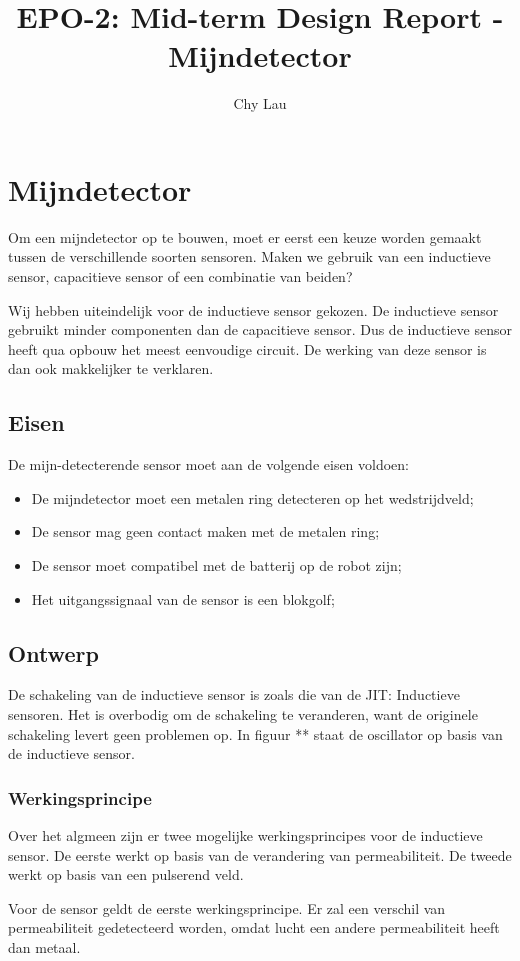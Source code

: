 \documentclass{report}
\title{EPO-2: Mid-term Design Report - Mijndetector}
\author{Chy Lau}
\begin{document}
\chapter{Mijndetector}
\label{ch:mijn}
Om een mijndetector op te bouwen, moet er eerst een keuze worden gemaakt tussen de verschillende soorten sensoren. Maken we gebruik van een inductieve sensor, capacitieve sensor of een combinatie van beiden?

Wij hebben uiteindelijk voor de inductieve sensor gekozen. De inductieve sensor gebruikt minder componenten dan de capacitieve sensor. Dus de inductieve sensor heeft qua opbouw het meest eenvoudige circuit. De werking van deze sensor is dan ook makkelijker te verklaren. 

\section{Eisen}
\label{sec:eisen}
De mijn-detecterende sensor moet aan de volgende eisen voldoen: 
\begin{itemize}
\item De mijndetector moet een metalen ring detecteren op het wedstrijdveld;
\item De sensor mag geen contact maken met de metalen ring;
\item De sensor moet compatibel met de batterij op de robot zijn; 
\item Het uitgangssignaal van de sensor is een blokgolf;
\end{itemize}

\section{Ontwerp}
\label{sec:ontwerp}
De schakeling van de inductieve sensor is zoals die van de JIT: Inductieve sensoren. Het is overbodig om de schakeling te veranderen, want de originele schakeling levert geen problemen op. In figuur ** staat de oscillator op basis van de inductieve sensor.

\subsection{Werkingsprincipe}
\label{ssec:werking}
Over het algmeen zijn er twee mogelijke werkingsprincipes voor de inductieve sensor. De eerste werkt op basis van de verandering van permeabiliteit. De tweede werkt op basis van een pulserend veld. 

Voor de sensor geldt de eerste werkingsprincipe. Er zal een verschil van permeabiliteit gedetecteerd worden, omdat lucht een andere permeabiliteit heeft dan metaal. 
\end{document}
